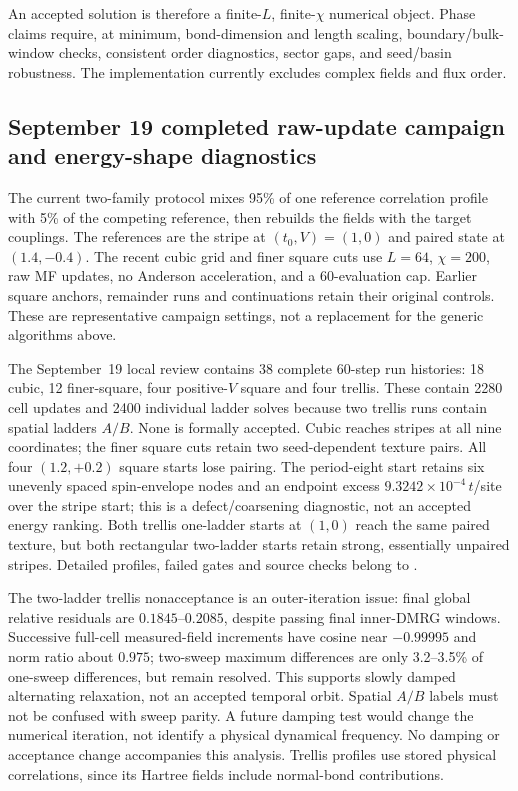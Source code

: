 \documentclass[11pt]{article}
\begin{document}
An accepted solution is therefore a finite-\(L\), finite-\(\chi\) numerical
object.  Phase claims require, at minimum, bond-dimension and length scaling,
boundary/bulk-window checks, consistent order diagnostics, sector gaps, and
seed/basin robustness.  The implementation currently excludes complex fields
and flux order.

\subsection{September 19 completed raw-update campaign and energy-shape diagnostics}

The current two-family protocol mixes 95\% of one reference correlation
profile with 5\% of the competing reference, then rebuilds the fields with
the target couplings. The references are the stripe at $(t_0,V)=(1,0)$
and paired state at $(1.4,-0.4)$. The recent cubic grid and finer square
cuts use $L=64$, $\chi=200$, raw MF updates, no Anderson acceleration,
and a 60-evaluation cap. Earlier square anchors, remainder runs and
continuations retain their original controls. These are representative
campaign settings, not a replacement for the generic algorithms above.

The September~19 local review contains 38 complete 60-step run histories:
18 cubic, 12 finer-square, four positive-$V$ square and four trellis.
These contain 2280 cell updates and 2400 individual ladder solves because
two trellis runs contain spatial ladders $A/B$. None is formally accepted.
Cubic reaches stripes at all nine coordinates; the finer square cuts retain
two seed-dependent texture pairs. All four $(1.2,+0.2)$ square starts lose
pairing. The period-eight start retains six unevenly spaced spin-envelope
nodes and an endpoint excess $9.3242\times10^{-4}\,t$/site over the stripe
start; this is a defect/coarsening diagnostic, not an accepted energy ranking.
Both trellis one-ladder starts at $(1,0)$ reach the same paired texture,
but both rectangular two-ladder starts retain strong, essentially unpaired
stripes. Detailed profiles, failed gates and source checks belong to
.

The two-ladder trellis nonacceptance is an outer-iteration issue:
final global relative residuals are $0.1845$--$0.2085$, despite passing
final inner-DMRG windows. Successive full-cell measured-field increments
have cosine near $-0.99995$ and norm ratio about $0.975$; two-sweep
maximum differences are only 3.2--3.5\% of one-sweep differences, but
remain resolved. This supports slowly damped alternating relaxation,
not an accepted temporal orbit. Spatial $A/B$ labels must not be confused
with sweep parity. A future damping test would change the numerical
iteration, not identify a physical dynamical frequency. No damping or
acceptance change accompanies this analysis. Trellis profiles use stored physical correlations,
since its Hartree fields include normal-bond contributions.
\end{document}
